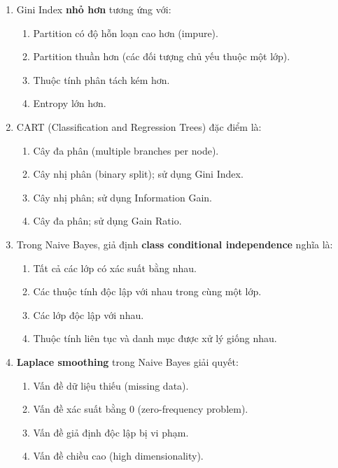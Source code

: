 \documentclass[10pt]{article}
\begin{document}
\begin{enumerate}[leftmargin=*, label=\textbf{Câu \arabic*.}]
    \item Gini Index \textbf{nhỏ hơn} tương ứng với:
    \begin{enumerate}[label=\Alph*.]
        \item Partition có độ hỗn loạn cao hơn (impure).
        \item Partition thuần hơn (các đối tượng chủ yếu thuộc một lớp).
        \item Thuộc tính phân tách kém hơn.
        \item Entropy lớn hơn.
    \end{enumerate}

    \item CART (Classification and Regression Trees) đặc điểm là:
    \begin{enumerate}[label=\Alph*.]
        \item Cây đa phân (multiple branches per node).
        \item Cây nhị phân (binary split); sử dụng Gini Index.
        \item Cây nhị phân; sử dụng Information Gain.
        \item Cây đa phân; sử dụng Gain Ratio.
    \end{enumerate}

    \item Trong Naive Bayes, giả định \textbf{class conditional independence} nghĩa là:
    \begin{enumerate}[label=\Alph*.]
        \item Tất cả các lớp có xác suất bằng nhau.
        \item Các thuộc tính độc lập với nhau trong cùng một lớp.
        \item Các lớp độc lập với nhau.
        \item Thuộc tính liên tục và danh mục được xử lý giống nhau.
    \end{enumerate}

    \item \textbf{Laplace smoothing} trong Naive Bayes giải quyết:
    \begin{enumerate}[label=\Alph*.]
        \item Vấn đề dữ liệu thiếu (missing data).
        \item Vấn đề xác suất bằng 0 (zero-frequency problem).
        \item Vấn đề giả định độc lập bị vi phạm.
        \item Vấn đề chiều cao (high dimensionality).
    \end{enumerate}


\end{enumerate}
\end{document}
